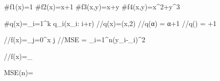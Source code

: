 #f1(x)=1
#f2(x)=x+1
#f3(x,y)=x+y
#f4(x,y)=x^2+y^3

#q(x)=\prod_{i=1}^k q_i\left(x_{i: i+r}\right)
//q(x)=\pow(x,2)
//q(α) = α+1
//q(\alpha) = \alpha+1

//f(x)=\sum_{j=0}^x j
//MSE = \sum_{i=1}^n(y_i-_i)^2

//f(x)=\sum_

MSE(n)=
